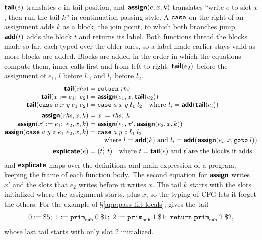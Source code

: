 $\textsf{\bfseries tail}(e)$ translates $e$ in tail position, and
$\textsf{\bfseries assign}(e, x, k)$ translates ``write $e$ to slot $x$, then run
the tail $k$'' in continuation-passing style. A $\mathtt{case}$ on the
right of an assignment adds $k$ as a block, the join point, to which
both branches jump. $\textsf{\bfseries add}(t)$ adds the block $t$ and returns its
label. Both functions thread the blocks made so far, each typed over
the older ones, so a label made earlier stays valid as more blocks are
added. Blocks are added in the order in which the equations compute
them, inner calls first and from left to right: $\textsf{\bfseries tail}(e_2)$
before the assignment of $e_1$, $l$ before $l_1$, and $l_1$ before
$l_2$.
\[
\begin{array}{@{}r@{\;}c@{\;}l@{}}
  \pass{tail}(\rhs) & = & \kw{return}\;\rhs\\
  \pass{tail}(x \mathrel{:=} e_1;\; e_2) & = & \pass{assign}(e_1, x, \pass{tail}(e_2))\\
  \pass{tail}(\kw{case}\;a\;x\;y\;e_1\;e_2) & = & \kw{case}\;a\;x\;y\;l_1\;l_2
    \quad \text{where } l_i = \pass{add}(\pass{tail}(e_i))\\[4pt]
  \pass{assign}(\rhs, x, k) & = & x \mathrel{:=} \rhs;\; k\\
  \pass{assign}(x' \mathrel{:=} e_1;\; e_2, x, k) & = & \pass{assign}(e_1, x', \pass{assign}(e_2, x, k))\\
  \pass{assign}(\kw{case}\;a\;y\;z\;e_1\;e_2, x, k) & = & \kw{case}\;a\;y\;z\;l_1\;l_2\\
  & & \quad \text{where } l = \pass{add}(k) \text{ and } l_i = \pass{add}(\pass{assign}(e_i, x, \kw{goto}\;l))\\[4pt]
  \pass{explicate}(e) & = & (\vec{t};\; t)
    \quad \text{where } t = \pass{tail}(e) \text{ and } \vec{t} \text{ are the blocks it adds}
\end{array}
\]
and $\textsf{\bfseries explicate}$ maps over the definitions and main expression of
a program, keeping the frame of each function body. The second
equation for $\textsf{\bfseries assign}$ writes $x'$ and the slots that $e_2$
writes before it writes $x$. The tail $k$ starts with the slots
initialized where the assignment starts, plus $x$, so the typing of
CFG lets it forget the others. For the example of
\S\ref{app:pass-lift-locals},  gives the tail
\[
  0 \mathrel{:=} \$5;\; 1 \mathrel{:=} \mathtt{prim}_{\mathtt{sub}}\;0\;\$1;\;
  2 \mathrel{:=} \mathtt{prim}_{\mathtt{sub}}\;1\;\$1;\; \mathtt{return}\;\mathtt{prim}_{\mathtt{sub}}\;2\;\$2,
\]
whose last tail starts with only slot 2 initialized.

